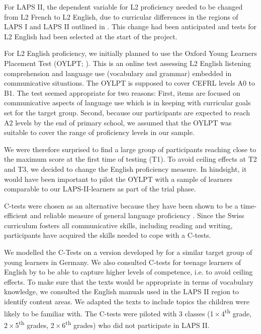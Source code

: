\documentclass[output=paper]{langsci/langscibook}
\begin{document}
For LAPS II, the dependent variable for L2 proficiency needed to be changed from L2 French to L2 English, due to curricular differences in the regions of LAPS I and LAPS II outlined in . This change had been anticipated and tests for L2 English had been selected at the start of the project.

For L2 English proficiency, we initially planned to use the Oxford Young Learners Placement Test (OYLPT; \citealt{Testing2013}). This is an online test assessing L2 English listening comprehension and language use (vocabulary and grammar) embedded in communicative situations. The OYLPT is supposed to cover CEFRL levels A0 to B1. The test seemed appropriate for two reasons: First, items are focused on communicative aspects of language use which is in keeping with curricular goals set for the target group. Second, because our participants are expected to reach A2 levels by the end of primary school, we assumed that the OYLPT was suitable to cover the range of proficiency levels in our sample. 

We were therefore surprised to find a large group of participants reaching close to the maximum score at the first time of testing (T1). To avoid ceiling effects at T2 and T3, we decided to change the English proficiency measure. In hindsight, it would have been important to pilot the OYLPT with a sample of learners comparable to our LAPS-II-learners as part of the trial phase. 

C-tests were chosen as an alternative because they have been shown to be a time-efficient and reliable measure of general language proficiency \citep{EckesGrotjahn2006}. Since the Swiss curriculum fosters all communicative skills, including reading and writing, participants have acquired the skills needed to cope with a C-tests. 

We modelled the C-Tests on a version developed by \citet{WildenPorsch2017} for a similar target group of young learners in Germany. We also consulted C-tests for teenage learners of English by \citet{BabaiiShahri2010} to be able to capture higher levels of competence, i.e. to avoid ceiling effects. To make sure that the texts would be appropriate in terms of vocabulary knowledge, we consulted the English manuals used in the LAPS II region to identify content areas. We adapted the texts to include topics the children were likely to be familiar with. The C-tests were piloted with 3 classes (1\,×\,4\textsuperscript{th} grade, 2\,×\,5\textsuperscript{th} grades, 2\,×\,6\textsuperscript{th} grades) who did not participate in LAPS II. 
\end{document}
